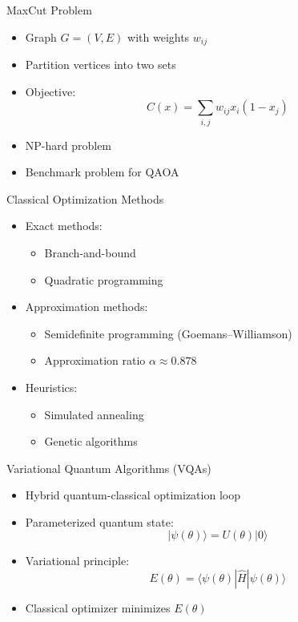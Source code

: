 \documentclass{beamer}
\begin{document}

\begin{frame}{MaxCut Problem}
\begin{itemize}
\item Graph $G=(V,E)$ with weights $w_{ij}$
\item Partition vertices into two sets
\item Objective:
\[
C(x) = \sum_{i,j} w_{ij} x_i(1-x_j)
\]
\item NP-hard problem
\item Benchmark problem for QAOA
\end{itemize}
\end{frame}


\begin{frame}{Classical Optimization Methods}
\begin{itemize}
\item Exact methods:
\begin{itemize}
\item Branch-and-bound
\item Quadratic programming
\end{itemize}
\item Approximation methods:
\begin{itemize}
\item Semidefinite programming (Goemans–Williamson)
\item Approximation ratio $\alpha \approx 0.878$
\end{itemize}
\item Heuristics:
\begin{itemize}
\item Simulated annealing
\item Genetic algorithms
\end{itemize}
\end{itemize}
\end{frame}


\begin{frame}{Variational Quantum Algorithms (VQAs)}
\begin{itemize}
\item Hybrid quantum-classical optimization loop
\item Parameterized quantum state:
\[
|\psi(\theta)\rangle = U(\theta)|0\rangle
\]
\item Variational principle:
\[
E(\theta) = \langle \psi(\theta) | \hat{H} | \psi(\theta) \rangle
\]
\item Classical optimizer minimizes $E(\theta)$
\end{itemize}
\end{frame}
\end{document}
